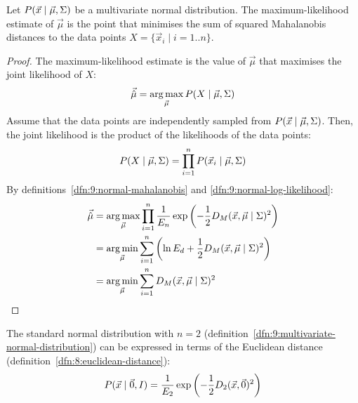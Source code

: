 \begin{thm}
  Let $P(\vec{x} \mid \vec{\mu}, \Sigma)$ be a multivariate normal
  distribution.
  The maximum-likelihood estimate of $\vec{\mu}$ is the point that minimises the
  sum of squared Mahalanobis distances to the data points $X = \{ \vec{x}_i \mid
    i = 1 .. n \}$.

  \begin{proof}
    The maximum-likelihood estimate is the value of $\vec{\mu}$ that maximises
    the joint likelihood of $X$:
    \begin{equation}
      \vec{\hat{\mu}} = \operatorname*{arg\,max}_{\vec{\mu}}
      P(X \mid \vec{\mu}, \Sigma)
    \end{equation}
    Assume that the data points
    are independently sampled from $P(\vec{x} \mid \vec{\mu}, \Sigma)$.
    Then, the joint likelihood is the product of the likelihoods of the data
    points:
    \begin{equation}
      P(X \mid \vec{\mu}, \Sigma)
      = \prod_{i = 1}^n P(\vec{x}_i \mid \vec{\mu}, \Sigma)
    \end{equation}
    By definitions~\ref{dfn:9:normal-mahalanobis} and
    \ref{dfn:9:normal-log-likelihood}:
    \begin{align}
      \vec{\hat{\mu}}
       & = \operatorname*{arg\,max}_{\vec{\mu}}
      \prod_{i = 1}^n
      \frac{1}{E_n}
      \exp \left( -\frac{1}{2} D_M (\vec{x}, \vec{\mu} \mid \Sigma)^2 \right)
      \\
       & = \operatorname*{arg\,min}_{\vec{\mu}}
      \sum_{i = 1}^n
      \left( \ln E_d + \frac{1}{2} D_M (\vec{x}, \vec{\mu} \mid \Sigma)^2 \right)
      \\
       & = \operatorname*{arg\,min}_{\vec{\mu}} \sum_{i = 1}^n D_M (\vec{x}, \vec{\mu} \mid \Sigma)^2
    \end{align}
  \end{proof}
\end{thm}

\begin{dfn}
  \label{dfn:9:normal-euclidean}
  The standard normal distribution with $n = 2$
  (definition~\ref{dfn:9:multivariate-normal-distribution})
  can be expressed in terms of the Euclidean distance
  (definition~\ref{dfn:8:euclidean-distance}):
  \begin{equation}
    P(\vec{x} \mid \vec{0}, I)
    = \frac{1}{E_2} \exp\left( - \frac{1}{2} D_2 (\vec{x}, \vec{0})^2 \right)
  \end{equation}
\end{dfn}

